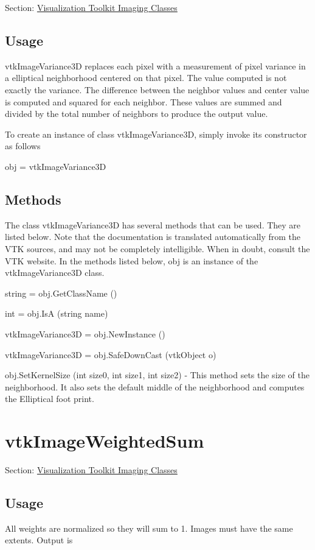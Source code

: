 Section\-: \hyperlink{sec_vtkimaging}{Visualization Toolkit Imaging Classes} \hypertarget{vtkwidgets_vtkxyplotwidget_Usage}{}\subsection{Usage}\label{vtkwidgets_vtkxyplotwidget_Usage}
vtk\-Image\-Variance3\-D replaces each pixel with a measurement of pixel variance in a elliptical neighborhood centered on that pixel. The value computed is not exactly the variance. The difference between the neighbor values and center value is computed and squared for each neighbor. These values are summed and divided by the total number of neighbors to produce the output value.

To create an instance of class vtk\-Image\-Variance3\-D, simply invoke its constructor as follows \begin{DoxyVerb}  obj = vtkImageVariance3D
\end{DoxyVerb}
 \hypertarget{vtkwidgets_vtkxyplotwidget_Methods}{}\subsection{Methods}\label{vtkwidgets_vtkxyplotwidget_Methods}
The class vtk\-Image\-Variance3\-D has several methods that can be used. They are listed below. Note that the documentation is translated automatically from the V\-T\-K sources, and may not be completely intelligible. When in doubt, consult the V\-T\-K website. In the methods listed below, {\ttfamily obj} is an instance of the vtk\-Image\-Variance3\-D class. 
\begin{DoxyItemize}
\item {\ttfamily string = obj.\-Get\-Class\-Name ()}  
\item {\ttfamily int = obj.\-Is\-A (string name)}  
\item {\ttfamily vtk\-Image\-Variance3\-D = obj.\-New\-Instance ()}  
\item {\ttfamily vtk\-Image\-Variance3\-D = obj.\-Safe\-Down\-Cast (vtk\-Object o)}  
\item {\ttfamily obj.\-Set\-Kernel\-Size (int size0, int size1, int size2)} -\/ This method sets the size of the neighborhood. It also sets the default middle of the neighborhood and computes the Elliptical foot print.  
\end{DoxyItemize}\hypertarget{vtkimaging_vtkimageweightedsum}{}\section{vtk\-Image\-Weighted\-Sum}\label{vtkimaging_vtkimageweightedsum}
Section\-: \hyperlink{sec_vtkimaging}{Visualization Toolkit Imaging Classes} \hypertarget{vtkwidgets_vtkxyplotwidget_Usage}{}\subsection{Usage}\label{vtkwidgets_vtkxyplotwidget_Usage}
All weights are normalized so they will sum to 1. Images must have the same extents. Output is

